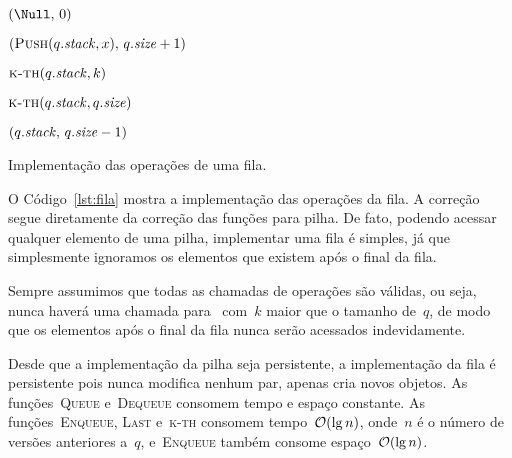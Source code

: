 \documentclass[main.tex]{subfiles}
\begin{document}
\begin{algorithm}
\begin{algorithmic}[1]
    \State \Return $(\Null,\,0)$
\EndFunction

    \State \Return $(\Call{Push}{q.\V{stack}, x},\,q.\V{size} + 1)$
\EndFunction

    \State \Return $\Call{k-th}{q.\V{stack}, k}$ 
\EndFunction

    \State \Return $\Call{k-th}{q.\V{stack}, q.\V{size}}$
\EndFunction

    \State \Return $(q.\mathit{stack},\,q.\mathit{size} - 1)$
\EndFunction

\end{algorithmic}
\caption{Implementação das operações de uma fila.} \label{lst:fila}
\end{algorithm}

O Código~\ref{lst:fila} mostra a implementação das operações da fila. A correção segue diretamente da correção das funções para pilha. De fato, podendo acessar qualquer elemento de uma pilha, implementar uma fila é simples, já que simplesmente ignoramos os elementos que existem após o final da fila.

Sempre assumimos que todas as chamadas de operações são válidas, ou seja, nunca haverá uma chamada para~ com~$k$ maior que o tamanho de~$q$, de modo que os elementos após o final da fila nunca serão acessados indevidamente.

Desde que a implementação da pilha seja persistente, a implementação da fila é persistente pois nunca modifica nenhum par, apenas cria novos objetos. As funções~\textsc{Queue} e~\textsc{Dequeue} consomem tempo e espaço constante. As funções~\textsc{Enqueue}, \textsc{Last} e~\textsc{k-th} consomem tempo~$\mathcal{O}(\lg n)$, onde~$n$ é o número de versões anteriores a~$q$, e~\textsc{Enqueue} também consome espaço~$\mathcal{O}(\lg n)$.
\end{document}

